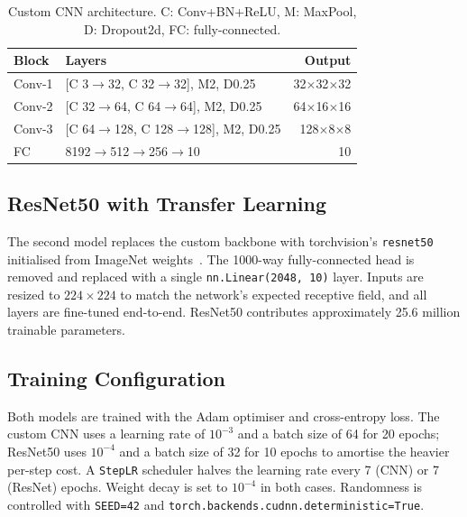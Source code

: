 \documentclass[conference]{IEEEtran}
\begin{document}
\begin{table}[t]
\caption{Custom CNN architecture. C: Conv+BN+ReLU, M: MaxPool,
D: Dropout2d, FC: fully-connected.}
\label{tab:cnn}
\centering
\begin{tabular}{llr}
\toprule
Block & Layers & Output \\
\midrule
Conv-1 & [C 3$\to$32, C 32$\to$32], M2, D0.25 & 32$\times$32$\times$32 \\
Conv-2 & [C 32$\to$64, C 64$\to$64], M2, D0.25 & 64$\times$16$\times$16 \\
Conv-3 & [C 64$\to$128, C 128$\to$128], M2, D0.25 & 128$\times$8$\times$8 \\
FC & 8192$\to$512$\to$256$\to$10 & 10 \\
\bottomrule
\end{tabular}
\end{table}

\subsection{ResNet50 with Transfer Learning}

The second model replaces the custom backbone with
torchvision's \texttt{resnet50}~\cite{he2016resnet} initialised from
ImageNet weights~\cite{russakovsky2015imagenet}. The 1000-way
fully-connected head is removed and replaced with a single
\texttt{nn.Linear(2048, 10)} layer. Inputs are resized to
$224\times224$ to match the network's expected receptive field, and
all layers are fine-tuned end-to-end. ResNet50 contributes
approximately 25.6 million trainable parameters.

\subsection{Training Configuration}

Both models are trained with the Adam optimiser and cross-entropy
loss. The custom CNN uses a learning rate of $10^{-3}$ and a batch
size of 64 for 20 epochs; ResNet50 uses $10^{-4}$ and a batch size
of 32 for 10 epochs to amortise the heavier per-step cost. A
\texttt{StepLR} scheduler halves the learning rate every 7 (CNN) or
7 (ResNet) epochs. Weight decay is set to $10^{-4}$ in both cases.
Randomness is controlled with \texttt{SEED=42} and
\texttt{torch.backends.cudnn.deterministic=True}.
\end{document}
